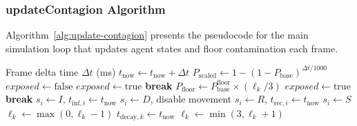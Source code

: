 \subsubsection{updateContagion Algorithm}

Algorithm~\ref{alg:update-contagion} presents the pseudocode for the main simulation loop that updates agent states and floor contamination each frame.

\begin{algorithm}[t]
\caption{updateContagion($\Delta t$)}
\label{alg:update-contagion}
\begin{algorithmic}[1]
\REQUIRE Frame delta time $\Delta t$ (ms)
\STATE $t_{\text{now}} \leftarrow t_{\text{now}} + \Delta t$
\STATE $P_{\text{scaled}} \leftarrow 1 - (1 - P_{\text{base}})^{\Delta t / 1000}$
    \STATE $exposed \leftarrow \text{false}$
                \STATE $exposed \leftarrow \text{true}$
                \STATE \textbf{break}
            \ENDIF
        \ENDIF
    \ENDFOR
                \STATE $P_{\text{floor}} \leftarrow P_{\text{base}}^{\text{floor}} \times (\ell_k / 3)$
                    \STATE $exposed \leftarrow \text{true}$
                    \STATE \textbf{break}
                \ENDIF
            \ENDIF
        \ENDFOR
    \ENDIF
        \STATE $s_i \leftarrow I$, $t_{\text{inf},i} \leftarrow t_{\text{now}}$
    \ENDIF
\ENDFOR
{}
            \STATE $s_i \leftarrow D$, disable movement
        \ELSE
            \STATE $s_i \leftarrow R$, $t_{\text{rec},i} \leftarrow t_{\text{now}}$
        \ENDIF
    \ENDIF
\ENDFOR
{}
        \STATE $s_i \leftarrow S$
    \ENDIF
\ENDFOR
{}
        \STATE $\ell_k \leftarrow \max(0, \ell_k - 1)$
        \STATE $t_{\text{decay},k} \leftarrow t_{\text{now}}$
    \ENDIF
            \STATE $\ell_k \leftarrow \min(3, \ell_k + 1)$
        \ENDIF
    \ENDFOR
\ENDFOR
\end{algorithmic}
\end{algorithm}

